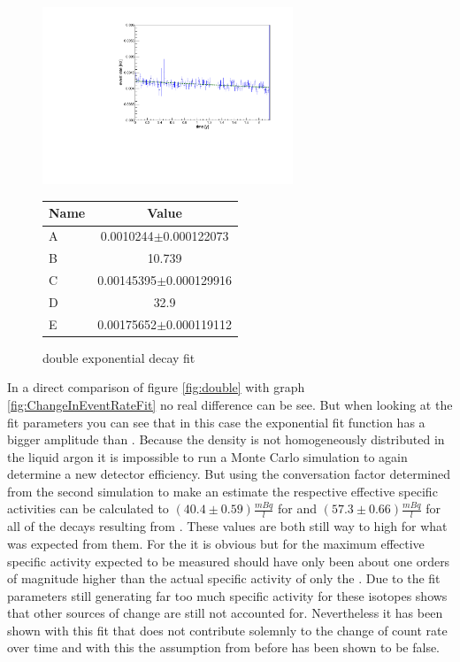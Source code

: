 \begin{figure}[t!]
	\centering
	\begin{minipage}{.5\textwidth}
	\centering
	\ifmakefigures%
	\includegraphics[width=75mm]{./Bilder/doppelt.pdf}
	\fi%
	\caption{double exponential decay fit}
	\label{fig:double}
	\end{minipage}%
	\begin{minipage}{.5\textwidth}
    \centering
    \begin{tabular}{|l|c|}
        \hline
        Name  & Value \\
        \hline
        A     & 0.0010244$\pm$0.000122073 \\
        \hline
        B    & 10.739 \\
        \hline
        C   & 0.00145395$\pm$0.000129916 \\
        \hline
        D  & 32.9 \\
        \hline
        E & 0.00175652$\pm$0.000119112 \\
        \hline
    \end{tabular}
    \label{tab:doubleFitpara}
	\end{minipage}
\end{figure}


In a direct comparison of figure \ref{fig:double} with graph \ref{fig:ChangeInEventRateFit} no real difference can be see.
But when looking at the fit parameters you can see that in this case the  exponential fit function has a bigger amplitude than \Kr.
Because the  density is not homogeneously distributed in the liquid argon it is impossible to run a Monte Carlo simulation to again determine a new detector efficiency.
But using the conversation factor determined from the second simulation to make an estimate the respective effective specific activities can be calculated to $(40.4\pm0.59)\frac{\unit{mBq}}{\unit{l}}$ for \Kr and $(57.3\pm0.66)\frac{\unit{mBq}}{\unit{l}}$ for all of the decays resulting from .
These values are both still way to high for what was expected from them.
For the \Kr it is obvious but for  the maximum effective specific activity expected to be measured should have only been about one orders of magnitude higher than the actual specific activity of only the .
Due to the fit parameters still generating far too much specific activity for these isotopes shows that other sources of change are still not accounted for.
Nevertheless it has been shown with this fit that \Kr does not contribute solemnly to the change of count rate over time and with this the assumption from before has been shown to be false.
\\

